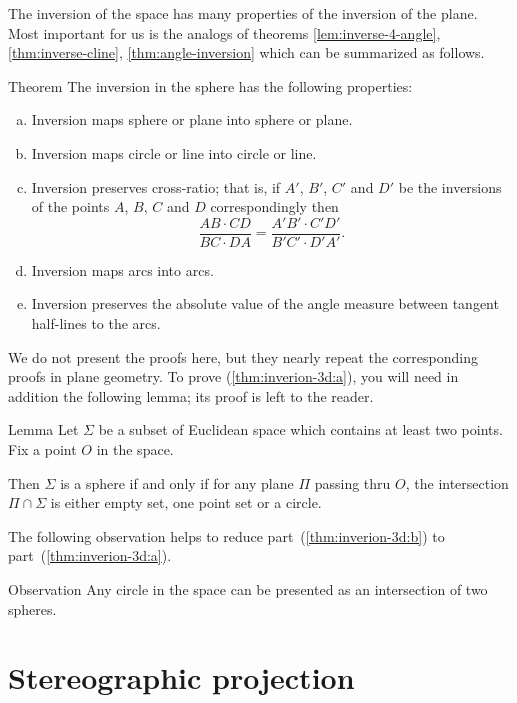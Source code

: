 The inversion of the space 
has many properties 
of the inversion of the plane.
Most important for us is the analogs of theorems \ref{lem:inverse-4-angle}, \ref{thm:inverse-cline}, \ref{thm:angle-inversion} which can be summarized as follows.

\begin{thm}{Theorem}\label{thm:inverion-3d}
The inversion in the sphere has the following properties:
\begin{enumerate}[(a)]
\item\label{thm:inverion-3d:a} Inversion maps sphere or plane into sphere or plane.
\item\label{thm:inverion-3d:b} Inversion maps circle or line into circle or line. 
\item\label{thm:inverion-3d:cross-ratio} Inversion preserves cross-ratio; that is, if $A'$, $B'$, $C'$ and $D'$ be the inversions of the points $A$, $B$, $C$ and $D$ correspondingly 
then
$$\frac{AB\cdot CD}{BC\cdot DA}= \frac{A'B'\cdot C'D'}{B'C'\cdot D'A'}.$$
\item Inversion maps arcs into arcs.
\item\label{thm:inverion-3d:angle} Inversion preserves the absolute value of the angle
measure between tangent half-lines to the arcs.
\end{enumerate}
\end{thm}


We do not present the proofs here, but
they nearly repeat the corresponding proofs in plane geometry.
To prove (\ref{thm:inverion-3d:a}), you will need in addition the following lemma;
its proof is left to the reader.

\begin{thm}{Lemma}
Let $\Sigma$ be a subset of Euclidean space
which contains at least two points.
Fix a point $O$ in the space.

Then $\Sigma$ is 
a sphere 
if and only if
for any plane $\Pi$ passing thru $O$,
the intersection $\Pi\cap \Sigma$ is either empty set,
one point set or a circle.
\end{thm}  

The following observation helps to reduce part~(\ref{thm:inverion-3d:b}) to part~(\ref{thm:inverion-3d:a}).

\begin{thm}{Observation}
Any circle in the space can be presented as an intersection of two spheres.
\end{thm}


\section*{Stereographic projection}

